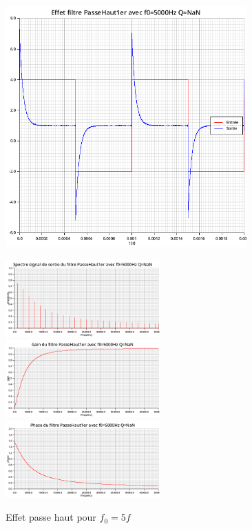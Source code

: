 \documentclass{article}
\begin{document}
\begin{figure}[H]
  \begin{minipage}{0.6\textwidth}
      \centering
      \includegraphics[width=25em]{images/creneau/haut/5/signals.png}
  \end{minipage}
  \begin{minipage}{0.3\textwidth}
      \centering
      \includegraphics[width=16em]{images/creneau/haut/5/fft_out.png}
      \vfill
      \includegraphics[width=16em]{images/creneau/haut/5/gain.png}
      \vfill
      \includegraphics[width=16em]{images/creneau/haut/5/phase.png}
  \end{minipage}
  \caption{Effet passe haut pour $f_0=5f$}
\end{figure}
\end{document}
